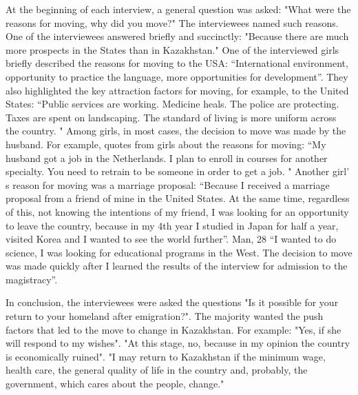 {At the beginning of each interview, a general question was asked: "What
were the reasons for moving, why did you move?" The interviewees named
such reasons. One of the interviewees answered briefly and succinctly:
"Because there are much more prospects in the States than in
Kazakhstan." One of the interviewed girls briefly described the reasons
for moving to the USA: ``International environment, opportunity to
practice the language, more opportunities for development''. They also
highlighted the key attraction factors for moving, for example, to the
United States: ``Public services are working. Medicine heals. The police
are protecting. Taxes are spent on landscaping. The standard of living
is more uniform across the country. " Among girls, in most cases, the
decision to move was made by the husband. For example, quotes from girls
about the reasons for moving: ``My husband got a job in the Netherlands.
I plan to enroll in courses for another specialty. You need to retrain
to be someone in order to get a job. " Another girl' s
reason for moving was a marriage proposal: ``Because I received a
marriage proposal from a friend of mine in the United States. At the
same time, regardless of this, not knowing the intentions of my friend,
I was looking for an opportunity to leave the country, because in my 4th
year I studied in Japan for half a year, visited Korea and I wanted to
see the world further''. Man, 28 ``I wanted to do science, I was looking
for educational programs in the West. The decision to move was made
quickly after I learned the results of the interview for admission to
the magistracy''.

In conclusion, the interviewees were asked the questions "Is it possible
for your return to your homeland after emigration?". The majority wanted
the push factors that led to the move to change in Kazakhstan. For
example: "Yes, if she will respond to my wishes". "At this stage, no,
because in my opinion the country is economically ruined". "I may return
to Kazakhstan if the minimum wage, health care, the general quality of
life in the country and, probably, the government, which cares about the
people, change."

}
